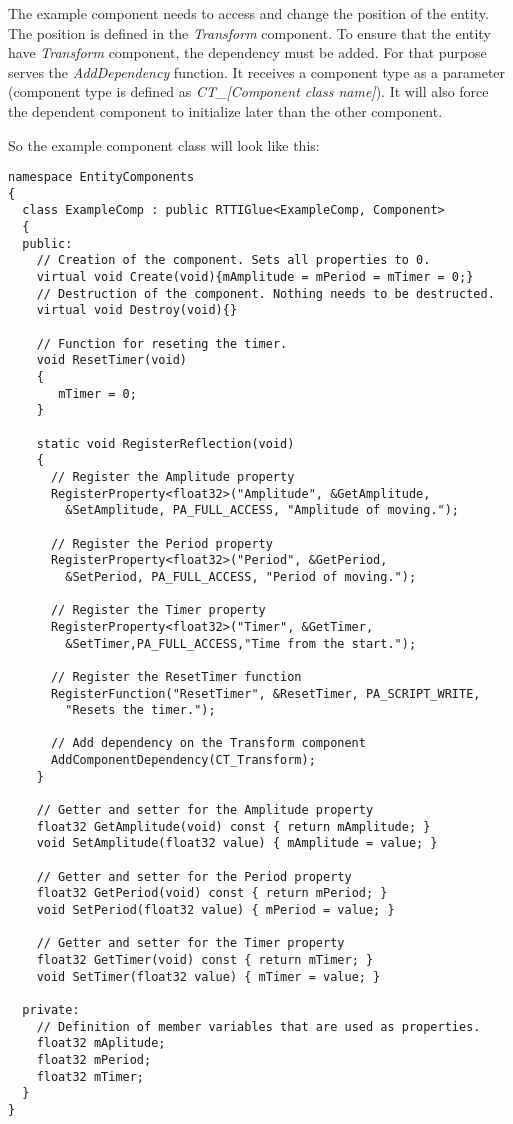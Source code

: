 \documentclass[a4paper, 12pt]{report}
\begin{document}
The example component needs to access and change the position of the entity. The position is defined in the \emph{Transform} component. To ensure that the entity have \emph{Transform} component, the dependency must be added. For that purpose serves the \emph{AddDependency} function. It receives a component type as a parameter (component type is defined as \emph{CT\_[Component class name]}). It will also force the dependent component to initialize later than the other component.

So the example component class will look like this: 

\footnotesize 
\begin{verbatim}
namespace EntityComponents
{
  class ExampleComp : public RTTIGlue<ExampleComp, Component>
  {
  public:
    // Creation of the component. Sets all properties to 0.
    virtual void Create(void){mAmplitude = mPeriod = mTimer = 0;}
    // Destruction of the component. Nothing needs to be destructed.
    virtual void Destroy(void){}

    // Function for reseting the timer.
    void ResetTimer(void)
    {
       mTimer = 0;
    }

    static void RegisterReflection(void)
    {
      // Register the Amplitude property
      RegisterProperty<float32>("Amplitude", &GetAmplitude,
        &SetAmplitude, PA_FULL_ACCESS, "Amplitude of moving.");

      // Register the Period property
      RegisterProperty<float32>("Period", &GetPeriod, 
        &SetPeriod, PA_FULL_ACCESS, "Period of moving.");

      // Register the Timer property
      RegisterProperty<float32>("Timer", &GetTimer, 
        &SetTimer,PA_FULL_ACCESS,"Time from the start.");

      // Register the ResetTimer function
      RegisterFunction("ResetTimer", &ResetTimer, PA_SCRIPT_WRITE,
        "Resets the timer.");

      // Add dependency on the Transform component
      AddComponentDependency(CT_Transform);
    }

    // Getter and setter for the Amplitude property
    float32 GetAmplitude(void) const { return mAmplitude; }
    void SetAmplitude(float32 value) { mAmplitude = value; }

    // Getter and setter for the Period property
    float32 GetPeriod(void) const { return mPeriod; }
    void SetPeriod(float32 value) { mPeriod = value; }

    // Getter and setter for the Timer property	
    float32 GetTimer(void) const { return mTimer; }
    void SetTimer(float32 value) { mTimer = value; }

  private:
    // Definition of member variables that are used as properties.
    float32 mAplitude;
    float32 mPeriod;
    float32 mTimer;
  }
}
\end{verbatim}
\normalsize
\end{document}
